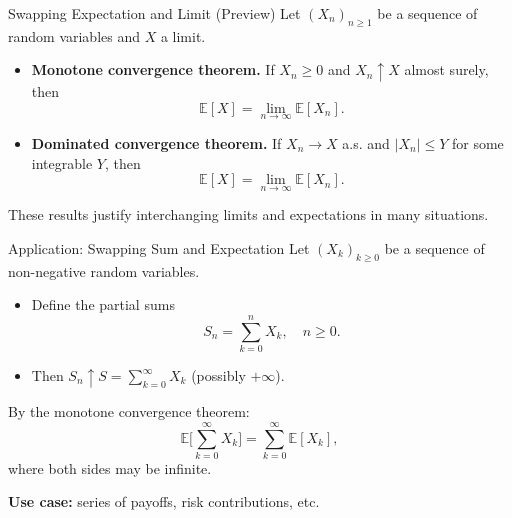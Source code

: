 \documentclass[aspectratio=169]{beamer}
\begin{document}
\begin{frame}{Swapping Expectation and Limit (Preview)}
Let \((X_n)_{n\ge1}\) be a sequence of random variables and \(X\) a limit.\pause
\begin{itemize}
  \item \textbf{Monotone convergence theorem.}  
  If \(X_n\ge0\) and \(X_n\uparrow X\) almost surely, then
  \[
    \mathbb{E}[X] = \lim_{n\to\infty} \mathbb{E}[X_n].
  \]\pause
  \item \textbf{Dominated convergence theorem.}  
  If \(X_n\to X\) a.s. and \(|X_n|\le Y\) for some integrable \(Y\), then
  \[
    \mathbb{E}[X] = \lim_{n\to\infty} \mathbb{E}[X_n].
  \]\pause
\end{itemize}
These results justify interchanging limits and expectations in many situations.
\end{frame}

\begin{frame}{Application: Swapping Sum and Expectation}
Let \((X_k)_{k\ge0}\) be a sequence of non-negative random variables.
\begin{itemize}
  \item Define the partial sums
  \[
  S_n = \sum_{k=0}^n X_k,\quad n\ge0.
  \]\pause
  \item Then \(S_n\uparrow S=\sum_{k=0}^\infty X_k\) (possibly \(+\infty\)).
\end{itemize}

By the monotone convergence theorem:
\[
\mathbb{E}\Big[\sum_{k=0}^\infty X_k\Big]
= \sum_{k=0}^\infty \mathbb{E}[X_k],
\]\pause
where both sides may be infinite.

\medskip

\textbf{Use case:} series of payoffs, risk contributions, etc.

\end{frame}
\end{document}
